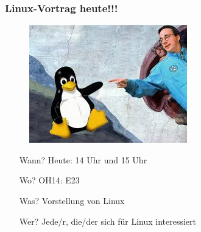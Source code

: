 \documentclass{beamer}
\begin{document}
\begin{frame}
\frametitle{Linux-Vortrag heute!!!}
\begin{figure}
\includegraphics[scale=0.7]{tuxlinus.jpeg}
\end{figure}
\begin{itemize}
		\item[Wann?] Heute: 14 Uhr und 15 Uhr
		\item[Wo?] OH14: E23
		\item[Was?] Vorstellung von Linux
		\item[Wer?] Jede/r, die/der sich für Linux interessiert
\end{itemize}
\end{frame}
\end{document}
